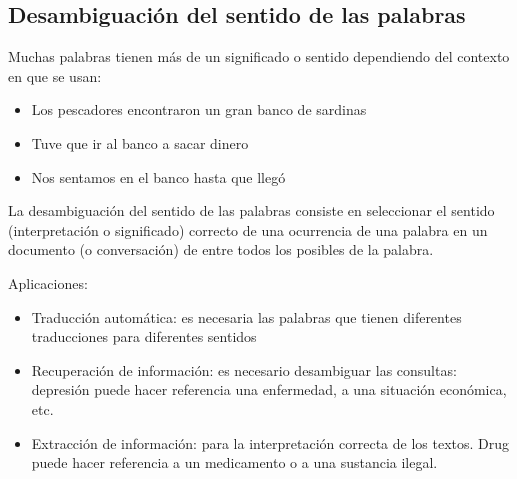 \documentclass{ctexart}
\begin{document}
	\subsection{Desambiguación del sentido de las palabras}
	\begin{flushleft}
		Muchas palabras tienen más de un significado o sentido dependiendo del contexto en que se usan:
		\begin{itemize}
			\item Los pescadores encontraron un gran banco de sardinas
			\item Tuve que ir al banco a sacar dinero
			\item Nos sentamos en el banco hasta que llegó
		\end{itemize}
		La desambiguación del sentido de las palabras consiste en seleccionar el sentido (interpretación o significado) correcto de una ocurrencia de una palabra en un documento (o conversación) de entre todos los posibles de la palabra. \par 
		Aplicaciones:
		\begin{itemize}
			\item Traducción automática: es necesaria las palabras que tienen diferentes traducciones para diferentes sentidos
			\item Recuperación de información: es necesario desambiguar las	consultas: depresión puede hacer referencia una enfermedad, a una situación económica, etc.
			\item Extracción de información: para la interpretación correcta de los textos. Drug puede hacer referencia a un medicamento o a una sustancia ilegal.
		\end{itemize}
	\end{flushleft}
\end{document}
